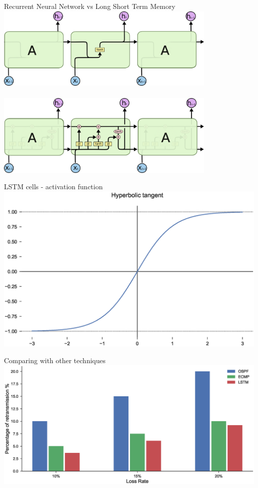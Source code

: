 \documentclass{beamer}
\begin{document}
\begin{frame}[noframenumbering]{Recurrent Neural Network vs Long Short Term Memory}
\centering
\includegraphics[width=0.8\textwidth]{img/simple_rnn}\\~\\
\includegraphics[width=0.8\textwidth]{img/simple_lstm}
\end{frame}
\begin{frame}[noframenumbering]{LSTM cells - activation function}
\includegraphics[width=\textwidth]{img/tanh.eps}
\end{frame}
\begin{frame}[noframenumbering]{Comparing with other techniques}
\includegraphics[width=\textwidth]{img/prediction_cmp_bar_ecmp}
\end{frame}
\end{document}
